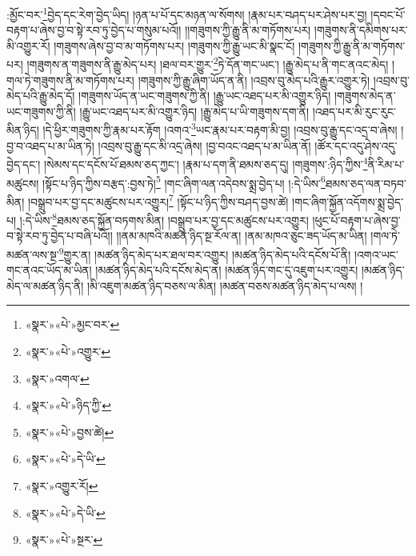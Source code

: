 :མྱོང་བར་\footnote{«སྣར་»«པེ་»མྱང་བར་}བྱེད་དང་རེག་བྱེད་ཡིད། །ཉན་པ་པོ་དང་མཉན་ལ་སོགས། །རྣམ་པར་བཤད་པར་ཤེས་པར་བྱ། །དབང་པོ་བརྟག་པ་ཞེས་བྱ་བ་སྟེ་རབ་ཏུ་བྱེད་པ་གསུམ་པའོ།། །།གཟུགས་ཀྱི་རྒྱུ་ནི་མ་གཏོགས་པར། །གཟུགས་ནི་དམིགས་པར་མི་འགྱུར་རོ། །གཟུགས་ཞེས་བྱ་བ་མ་གཏོགས་པར། །གཟུགས་ཀྱི་རྒྱུ་ཡང་མི་སྣང་ངོ། །གཟུགས་ཀྱི་རྒྱུ་ནི་མ་གཏོགས་པར། །གཟུགས་ན་གཟུགས་ནི་རྒྱུ་མེད་པར། །ཐལ་བར་གྱུར་\footnote{«སྣར་»«པེ་»འགྱུར་}ཏེ་དོན་གང་ཡང་། །རྒྱུ་མེད་པ་ནི་གང་ནའང་མེད། །གལ་ཏེ་གཟུགས་ནི་མ་གཏོགས་པར། །གཟུགས་ཀྱི་རྒྱུ་ཞིག་ཡོད་ན་ནི། །འབྲས་བུ་མེད་པའི་རྒྱུར་འགྱུར་ཏེ། །འབྲས་བུ་མེད་པའི་རྒྱུ་མེད་དོ། །གཟུགས་ཡོད་ན་ཡང་གཟུགས་ཀྱི་ནི། །རྒྱུ་ཡང་འཐད་པར་མི་འགྱུར་ཉིད། །གཟུགས་མེད་ན་ཡང་གཟུགས་ཀྱི་ནི། །རྒྱུ་ཡང་འཐད་པར་མི་འགྱུར་ཉིད། །རྒྱུ་མེད་པ་ཡི་གཟུགས་དག་ནི། །འཐད་པར་མི་རུང་རུང་མིན་ཉིད། །དེ་ཕྱིར་གཟུགས་ཀྱི་རྣམ་པར་རྟོག །འགའ་\footnote{«སྣར་»འགལ་}ཡང་རྣམ་པར་བརྟག་མི་བྱ། །འབྲས་བུ་རྒྱུ་དང་འདྲ་བ་ཞེས། །བྱ་བ་འཐད་པ་མ་ཡིན་ཏེ། །འབྲས་བུ་རྒྱུ་དང་མི་འདྲ་ཞེས། །བྱ་བའང་འཐད་པ་མ་ཡིན་ནོ། །ཚོར་དང་འདུ་ཤེས་འདུ་བྱེད་དང་། །སེམས་དང་དངོས་པོ་ཐམས་ཅད་ཀྱང་། །རྣམ་པ་དག་ནི་ཐམས་ཅད་དུ། །གཟུགས་:ཉིད་ཀྱིས་\footnote{«སྣར་»«པེ་»ཉིད་ཀྱི་}ནི་རིམ་པ་མཚུངས། །སྟོང་པ་ཉིད་ཀྱིས་བརྩད་:བྱས་ཏེ།\footnote{«སྣར་»«པེ་»བྱས་ཚེ།} །གང་ཞིག་ལན་འདེབས་སྨྲ་བྱེད་པ། །:དེ་ཡིས་\footnote{«སྣར་»«པེ་»དེ་ཡི་}ཐམས་ཅད་ལན་བཏབ་མིན། །བསྒྲུབ་པར་བྱ་དང་མཚུངས་པར་འགྱུར།\footnote{«སྣར་»འགྱུར་རོ།} །སྟོང་པ་ཉིད་ཀྱིས་བཤད་བྱས་ཚེ། །གང་ཞིག་སྐྱོན་འདོགས་སྨྲ་བྱེད་པ། །:དེ་ཡིས་\footnote{«སྣར་»«པེ་»དེ་ཡི་}ཐམས་ཅད་སྐྱོན་བཏགས་མིན། །བསྒྲུབ་པར་བྱ་དང་མཚུངས་པར་འགྱུར། །ཕུང་པོ་བརྟག་པ་ཞེས་བྱ་བ་སྟེ་རབ་ཏུ་བྱེད་པ་བཞི་པའོ།། །།ནམ་མཁའི་མཚན་ཉིད་སྔ་རོལ་ན། །ནམ་མཁའ་ཅུང་ཟད་ཡོད་མ་ཡིན། །གལ་ཏེ་མཚན་ལས་སྔ་\footnote{«སྣར་»«པེ་»སྔར་}གྱུར་ན། །མཚན་ཉིད་མེད་པར་ཐལ་བར་འགྱུར། །མཚན་ཉིད་མེད་པའི་དངོས་པོ་ནི། །འགའ་ཡང་གང་ནའང་ཡོད་མ་ཡིན། །མཚན་ཉིད་མེད་པའི་དངོས་མེད་ན། །མཚན་ཉིད་གང་དུ་འཇུག་པར་འགྱུར། །མཚན་ཉིད་མེད་ལ་མཚན་ཉིད་ནི། །མི་འཇུག་མཚན་ཉིད་བཅས་ལ་མིན། །མཚན་བཅས་མཚན་ཉིད་མེད་པ་ལས། །
